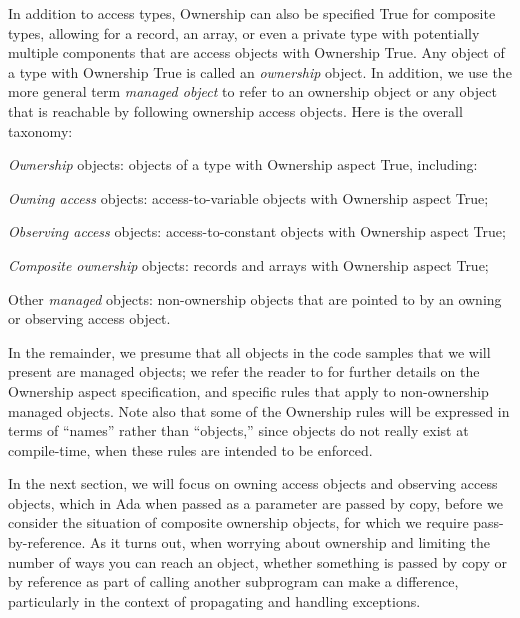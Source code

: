 \documentclass{llncs}
\begin{document}
In addition to access types, Ownership can also be specified True for composite types, allowing for a record, an array, or even a private type with potentially multiple components that are access objects with Ownership True.  Any object of a type with Ownership True is called an \textit{ownership} object.
In addition, we use the more general term \textit{managed object} to refer to an ownership object or any object that is reachable by following ownership access objects.
Here is the overall taxonomy:

\begin{compactitem}
\item \textit{Ownership} objects: objects of a type with Ownership aspect True, including:
    \begin{compactitem}
\item \textit{Owning access} objects: access-to-variable objects with Ownership aspect True;
\item \textit{Observing access} objects: access-to-constant objects with Ownership aspect True;
\item \textit{Composite ownership} objects: records and arrays with Ownership aspect True;
    \end{compactitem}
\item Other \textit{managed} objects: non-ownership objects that are pointed to by an owning or observing access object.
\end{compactitem}


In the remainder, we presume that all objects in the code samples that we will present are managed objects; we refer the reader to \cite{AI2018} for further details on
the Ownership aspect specification, and specific rules that apply to non-ownership managed objects. Note also that some of the Ownership rules will be expressed in terms
of ``names'' rather than ``objects,'' since objects do not really exist at compile-time, when these rules are intended to be enforced.


In the next section, we will focus on owning access objects and observing access objects, which in Ada when passed as a parameter are passed by copy, before we
consider the situation of composite ownership objects, for which we require pass-by-reference.  As it turns out, when worrying about ownership and limiting the number of ways you can reach an object, whether something is passed by copy or by reference as part of calling another subprogram can make a difference, particularly in the context of propagating and handling exceptions.
\end{document}
